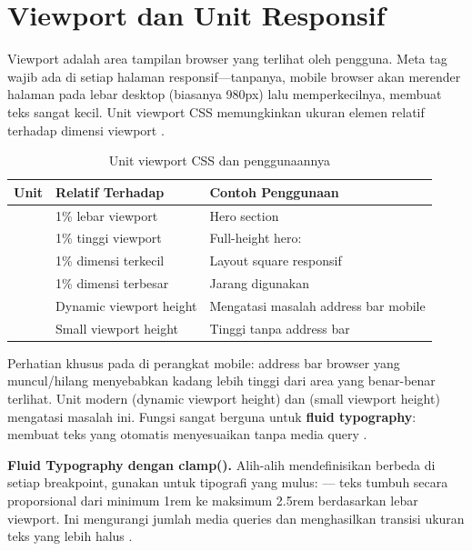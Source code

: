 \section{Viewport dan Unit Responsif}

Viewport adalah area tampilan browser yang terlihat oleh pengguna. Meta tag  wajib ada di setiap halaman responsif---tanpanya, mobile browser akan merender halaman pada lebar desktop (biasanya 980px) lalu memperkecilnya, membuat teks sangat kecil. Unit viewport CSS memungkinkan ukuran elemen relatif terhadap dimensi viewport \cite{mdnCss}.

\begin{table}[htbp]
\centering
\begin{tabular}{|P{1.5cm}|P{4cm}|P{6.5cm}|}
\hline
\textbf{Unit} & \textbf{Relatif Terhadap} & \textbf{Contoh Penggunaan} \\
\hline
{} & 1\% lebar viewport & Hero section  \\
\hline
{} & 1\% tinggi viewport & Full-height hero:  \\
\hline
{} & 1\% dimensi terkecil & Layout square responsif \\
\hline
{} & 1\% dimensi terbesar & Jarang digunakan \\
\hline
{} & Dynamic viewport height & Mengatasi masalah address bar mobile \\
\hline
{} & Small viewport height & Tinggi tanpa address bar \\
\hline
\end{tabular}
\caption{Unit viewport CSS dan penggunaannya}
\end{table}

Perhatian khusus pada  di perangkat mobile: address bar browser yang muncul/hilang menyebabkan  kadang lebih tinggi dari area yang benar-benar terlihat. Unit modern  (dynamic viewport height) dan  (small viewport height) mengatasi masalah ini. Fungsi  sangat berguna untuk \textbf{fluid typography}:  membuat teks yang otomatis menyesuaikan tanpa media query \cite{webdevCss}.

\begin{konsep}
\textbf{Fluid Typography dengan clamp().} Alih-alih mendefinisikan  berbeda di setiap breakpoint, gunakan  untuk tipografi yang mulus:  --- teks tumbuh secara proporsional dari minimum 1rem ke maksimum 2.5rem berdasarkan lebar viewport. Ini mengurangi jumlah media queries dan menghasilkan transisi ukuran teks yang lebih halus \cite{cssTricks}.
\end{konsep}

